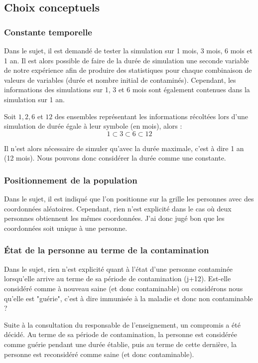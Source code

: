 \documentclass[12pt,french,titlepage]{article}
\begin{document}
\subsection{Choix conceptuels}
\subsubsection{Constante temporelle}
Dans le sujet, il est demandé de tester la simulation sur 1 mois, 3 mois, 6 mois et 1 an. Il est alors possible de faire de la durée de simulation une seconde variable de notre expérience afin de produire des statistiques pour chaque combinaison de valeurs de variables (durée et nombre initial de contaminés). Cependant, les informations des simulations sur 1, 3 et 6 mois sont également contenues dans la simulation sur 1 an. 

Soit $1,2,6$ et $12$ des ensembles représentant les informations récoltées lors d'une simulation de durée égale à leur symbole (en mois), alors :
$$
1 \subset 3 \subset 6 \subset 12
$$

Il n'est alors nécessaire de simuler qu'avec la durée maximale, c'est à dire 1 an (12 mois). Nous pouvons donc considérer la durée comme une constante.

\subsubsection{Positionnement de la population}
Dans le sujet, il est indiqué que l'on positionne sur la grille les personnes avec des coordonnées aléatoires. Cependant, rien n'est explicité dans le cas où deux personnes obtiennent les mêmes coordonnées. J'ai donc jugé bon que les coordonnées soit unique à une personne.

\subsubsection{État de la personne au terme de la contamination}
Dans le sujet, rien n'est explicité quant à l'état d'une personne contaminée lorsqu'elle arrive au terme de sa période de contamination (j+12). Est-elle considéré comme à nouveau saine (et donc contaminable) ou considérons nous qu'elle est "guérie", c'est à dire immunisée à la maladie et donc non contaminable ? 

Suite à la consultation du responsable de l'enseignement, un compromis a été décidé. Au terme de sa période de contamination, la personne est considérée comme guérie pendant une durée établie, puis au terme de cette dernière, la personne est reconsidéré comme saine (et donc contaminable).
\end{document}
